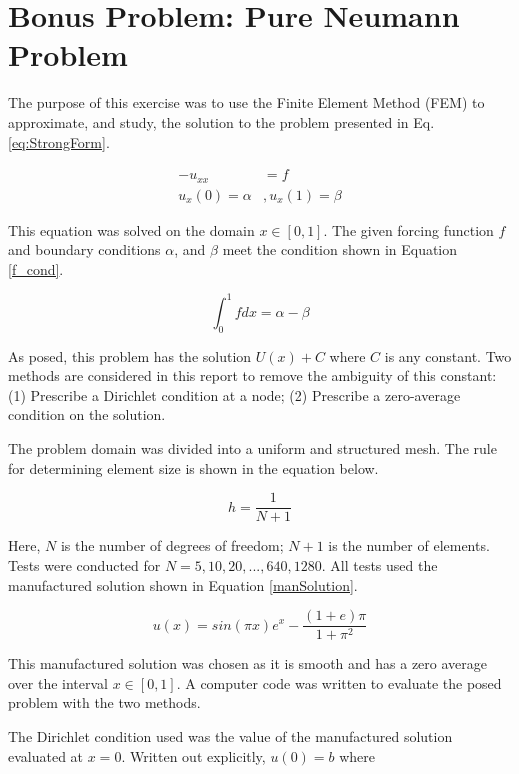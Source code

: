 \documentclass[a4paper, 12pt]{article}
\title{}
\begin{document}
\section*{Bonus Problem: Pure Neumann Problem} \label{sec:intro}
The purpose of this exercise was to use the Finite Element Method (FEM) 
to approximate, and study, the solution to the problem presented in 
Eq. \ref{eq:StrongForm}.

\begin{align}
   -u_{xx} &= f               \label{eq:StrongForm} \\
u_x(0) = \alpha &, u_x(1) = \beta
\end{align}

\noindent
This equation was solved on the domain $x\in[0,1]$.
The given forcing function $f$ and boundary conditions 
$\alpha$, and $\beta$ meet the condition
shown in Equation \ref{f_cond}.

\begin{equation} \label{f_cond}
  \int_0^1 f dx = \alpha - \beta
\end{equation}

\noindent
As posed, this problem has the solution $U(x) + C$ where $C$ is 
any constant. 
Two methods are considered in this report to remove the ambiguity
of this constant:
(1) Prescribe a Dirichlet condition at a node;
(2) Prescribe a zero-average condition on the solution.

The problem domain was divided into a uniform and structured mesh.
The rule for determining element size is shown in the equation below.

\begin{equation}
  h =  \frac{ 1}{ N+1}
\end{equation}

\noindent
Here, $N$ is the number of degrees of freedom; $N+1$ is the number of elements.
Tests were conducted for $N= 5, 10, 20, ..., 640, 1280$.
All tests used the manufactured solution shown
in Equation \ref{manSolution}.

\begin{equation} \label{manSolution}
  u(x) = sin( \pi x) e^x - \frac{(1+e)\pi}{1+\pi^2}
\end{equation}

\noindent
This manufactured solution was chosen as it is smooth and 
has a zero average over the interval $x\in[0,1]$.
A computer code was written to evaluate the posed problem
with the two methods.

The Dirichlet condition used was the 
value of the manufactured solution evaluated at $x=0$.
Written out explicitly, $u(0) = b$ where
\end{document}
